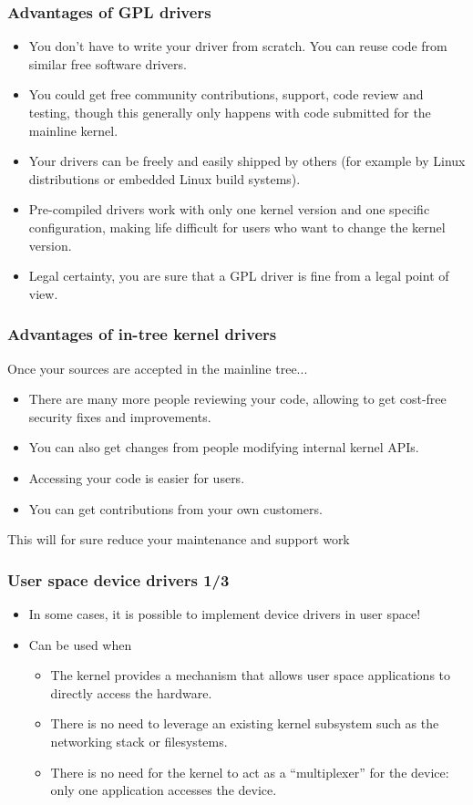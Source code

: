 \begin{frame}
  \frametitle{Advantages of GPL drivers}
  \begin{itemize}
  \item You don't have to write your driver from scratch. You can
    reuse code from similar free software drivers.
  \item You could get free community contributions, support, code
    review and testing, though this generally only happens with code
    submitted for the mainline kernel.
  \item Your drivers can be freely and easily shipped by others (for
    example by Linux distributions or embedded Linux build systems).
  \item Pre-compiled drivers work with only one kernel version and one
    specific configuration, making life difficult for users who want
    to change the kernel version.
  \item Legal certainty, you are sure that a GPL driver is fine from a
    legal point of view.
  \end{itemize}
\end{frame}

\begin{frame}
  \frametitle{Advantages of in-tree kernel drivers}
  Once your sources are accepted in the mainline tree...
  \begin{itemize}
  \item There are many more people reviewing your code, allowing to
    get cost-free security fixes and improvements.
  \item You can also get changes from people modifying internal
    kernel APIs.
  \item Accessing your code is easier for users.
  \item You can get contributions from your own customers.
  \end{itemize}
  This will for sure reduce your maintenance and support work
\end{frame}

\begin{frame}
  \frametitle{User space device drivers 1/3}
  \begin{itemize}
  \item In some cases, it is possible to implement device drivers in
    user space!
  \item Can be used when
    \begin{itemize}
    \item The kernel provides a mechanism that allows user space
      applications to directly access the hardware.
    \item There is no need to leverage an existing kernel subsystem
      such as the networking stack or filesystems.
    \item There is no need for the kernel to act as a ``multiplexer''
      for the device: only one application accesses the device.
    \end{itemize}
  \end{itemize}
\end{frame}

